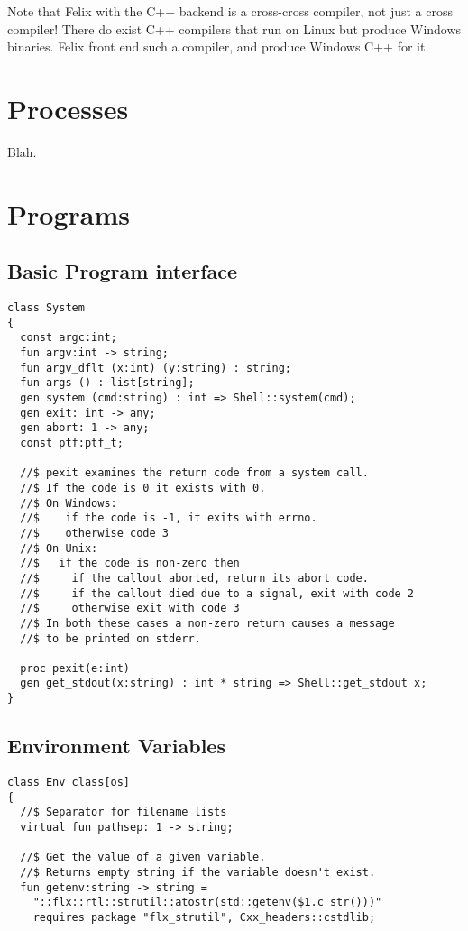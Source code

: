 \documentclass[oneside]{book}
\begin{document}
{Note that Felix with the C++ backend is a cross-cross
compiler, not just a cross compiler! There do exist
C++ compilers that run on Linux but produce Windows binaries.
Felix front end such a compiler, and produce Windows C++
for it.


\chapter{Processes}
Blah.

\chapter{Programs}
\section{Basic Program interface}
\begin{verbatim}
class System
{
  const argc:int;
  fun argv:int -> string;
  fun argv_dflt (x:int) (y:string) : string;
  fun args () : list[string];
  gen system (cmd:string) : int => Shell::system(cmd);
  gen exit: int -> any;
  gen abort: 1 -> any;
  const ptf:ptf_t;

  //$ pexit examines the return code from a system call.
  //$ If the code is 0 it exists with 0.
  //$ On Windows:
  //$    if the code is -1, it exits with errno.
  //$    otherwise code 3
  //$ On Unix:
  //$   if the code is non-zero then
  //$     if the callout aborted, return its abort code.
  //$     if the callout died due to a signal, exit with code 2
  //$     otherwise exit with code 3
  //$ In both these cases a non-zero return causes a message
  //$ to be printed on stderr.

  proc pexit(e:int)
  gen get_stdout(x:string) : int * string => Shell::get_stdout x;
}
\end{verbatim}

\section{Environment Variables}
\begin{verbatim}
class Env_class[os]
{
  //$ Separator for filename lists
  virtual fun pathsep: 1 -> string;

  //$ Get the value of a given variable.
  //$ Returns empty string if the variable doesn't exist.
  fun getenv:string -> string =
    "::flx::rtl::strutil::atostr(std::getenv($1.c_str()))"
    requires package "flx_strutil", Cxx_headers::cstdlib;


\end{verbatim}}
\end{document}
